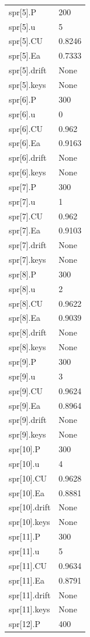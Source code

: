 {\begin{longtable}{p{}p{}}
{}spr[5].P & 200\\
{}spr[5].u & 5\\
{}spr[5].CU & 0.8246\\
{}spr[5].Ea & 0.7333\\
{}spr[5].drift & None\\
{}spr[5].keys & None\\
{}spr[6].P & 300\\
{}spr[6].u & 0\\
{}spr[6].CU & 0.962\\
{}spr[6].Ea & 0.9163\\
{}spr[6].drift & None\\
{}spr[6].keys & None\\
{}spr[7].P & 300\\
{}spr[7].u & 1\\
{}spr[7].CU & 0.962\\
{}spr[7].Ea & 0.9103\\
{}spr[7].drift & None\\
{}spr[7].keys & None\\
{}spr[8].P & 300\\
{}spr[8].u & 2\\
{}spr[8].CU & 0.9622\\
{}spr[8].Ea & 0.9039\\
{}spr[8].drift & None\\
{}spr[8].keys & None\\
{}spr[9].P & 300\\
{}spr[9].u & 3\\
{}spr[9].CU & 0.9624\\
{}spr[9].Ea & 0.8964\\
{}spr[9].drift & None\\
{}spr[9].keys & None\\
{}spr[10].P & 300\\
{}spr[10].u & 4\\
{}spr[10].CU & 0.9628\\
{}spr[10].Ea & 0.8881\\
{}spr[10].drift & None\\
{}spr[10].keys & None\\
{}spr[11].P & 300\\
{}spr[11].u & 5\\
{}spr[11].CU & 0.9634\\
{}spr[11].Ea & 0.8791\\
{}spr[11].drift & None\\
{}spr[11].keys & None\\
{}spr[12].P & 400\\

\end{longtable}}
